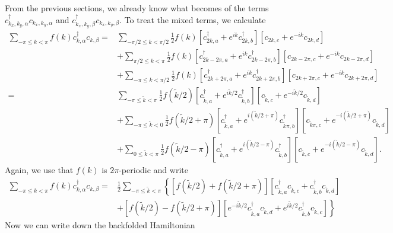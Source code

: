 \documentclass[english]{scrartcl}
\begin{document}
From the previous sections, we already know what becomes of the terms $c^\dagger_{k_x, k_y, \alpha}c_{k_x, k_y, \alpha}$ and $c^\dagger_{k_x, k_y, \beta}c_{k_x, k_y, \beta}$. To treat the mixed terms, we calculate
\begin{align*}
\sum_{- \pi \leq k < \pi} f(k) c^\dagger_{k, \alpha}c_{k, \beta} =&  \sum_{- \pi / 2 \leq k < \pi/2} \frac{1}{2} f(k) \left[ c^\dagger_{2k, a} + e^{ik} c^\dagger_{2k, b} \right]  \left[ c_{2k, c} + e^{-ik} c_{2k, d} \right] \\
&+ \sum_{\pi / 2 \leq k < \pi} \frac{1}{2} f(k) \left[ c^\dagger_{2k - 2 \pi, a} + e^{ik} c^\dagger_{2k - 2 \pi, b} \right]  \left[ c_{2k - 2 \pi, c} + e^{-ik} c_{2k - 2 \pi, d} \right] \\
&+ \sum_{- \pi \leq k < \pi/2} \frac{1}{2} f(k) \left[ c^\dagger_{2k + 2 \pi, a} + e^{ik} c^\dagger_{2k + 2 \pi, b} \right]  \left[ c_{2k + 2 \pi, c} + e^{-ik} c_{2k + 2 \pi, d} \right] \\
 =&  \sum_{-\pi \leq \tilde k < \pi} \frac{1}{2}  f(\tilde k / 2) \left[ c^\dagger_{\tilde k, a} + e^{i \tilde k / 2} c^\dagger_{\tilde k, b} \right]  \left[ c_{\tilde k, c} + e^{-i \tilde k / 2} c_{\tilde k, d} \right] \\
&+ \sum_{- \pi \leq \tilde k < 0} \frac{1}{2} f(\tilde k / 2 + \pi) \left[ c^\dagger_{\tilde k, a} + e^{i (\tilde k / 2 + \pi)} c^\dagger_{\tilde k \pi, b} \right]  \left[ c_{\tilde k \pi, c} + e^{-i(\tilde k / 2 + \pi)} c_{\tilde k, d} \right] \\
&+ \sum_{0 \leq \tilde k < \pi} \frac{1}{2} f(\tilde k / 2 - \pi) \left[ c^\dagger_{\tilde k, a} + e^{i(\tilde k / 2 - \pi)} c^\dagger_{\tilde k, b} \right]  \left[ c_{\tilde k, c} + e^{-i(\tilde k / 2 - \pi)} c_{\tilde k, d} \right].
\end{align*}
Again, we use that $f(k)$ is $2 \pi$-periodic and write
\begin{align*}
\sum_{- \pi \leq k < \pi} f(k) c^\dagger_{k, \alpha}c_{k, \beta} =& \frac{1}{2}   \sum_{-\pi \leq \tilde k < \pi} \left \{ \left[f(\tilde k / 2) + f(\tilde k / 2 + \pi) \right]  \left[ c^\dagger_{\tilde k, a}c_{\tilde k, c} + c^\dagger_{\tilde k, b}c_{\tilde k, d} \right] \right. \\
& \left . + \left[f(\tilde k / 2) - f(\tilde k / 2 + \pi) \right] \left[e^{-i\tilde k / 2} c^\dagger_{\tilde k, a}c_{\tilde k, d} + e^{i\tilde k / 2} c^\dagger_{\tilde k, b}c_{\tilde k, c} \right] \right \} 
\end{align*}
Now we can write down the backfolded Hamiltonian
\end{document}

